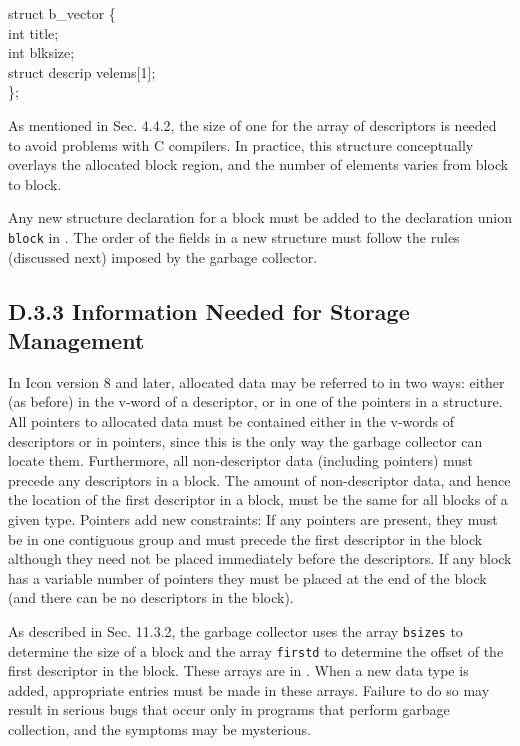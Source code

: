 \goodbreak
\begin{iconcode}
struct b\_vector \{\\
\>int title;\\
\>int blksize;\\
\>struct descrip velems[1];\\
\};
\end{iconcode}

\noindent
As mentioned in Sec. 4.4.2, the size of one for the array of
descriptors is needed to avoid problems with C compilers.  In
practice, this structure conceptually overlays the allocated block
region, and the number of elements varies from block to block.

Any new structure declaration for a block must be added to the declaration
union \texttt{block} in . The order of the fields in a
new structure must follow the rules (discussed next) imposed by the garbage
collector.

\subsection[D.3.3 Information Needed for Storage Management]%
           {D.3.3 Information Needed for Storage Management}

In Icon version 8 and later, allocated data may be referred to in two ways:
either (as before) in the v-word of a descriptor, or in one of the pointers
in a structure.  All pointers to allocated data must be contained either in
the v-words of descriptors or in pointers, since this is the only way the
garbage collector can locate them. Furthermore, all non-descriptor data
(including pointers) must precede any descriptors in a block. The amount of
non-descriptor data, and hence the location of the first descriptor in a
block, must be the same for all blocks of a given type. Pointers add new
constraints: If any pointers are present, they must be in one contiguous
group and must precede the first descriptor in the block although they need
not be placed immediately before the descriptors.  If any block has a
variable number of pointers they must be placed at the end of the block
(and there can be no descriptors in the block).

As described in Sec. 11.3.2, the garbage collector uses the array
\texttt{bsizes} to determine the size of a block and the array
\texttt{firstd} to determine the offset of the first descriptor in the
block. These arrays are in . When a new data type is
added, appropriate entries must be made in these arrays. Failure to do so
may result in serious bugs that occur only in programs that perform garbage
collection, and the symptoms may be mysterious.

